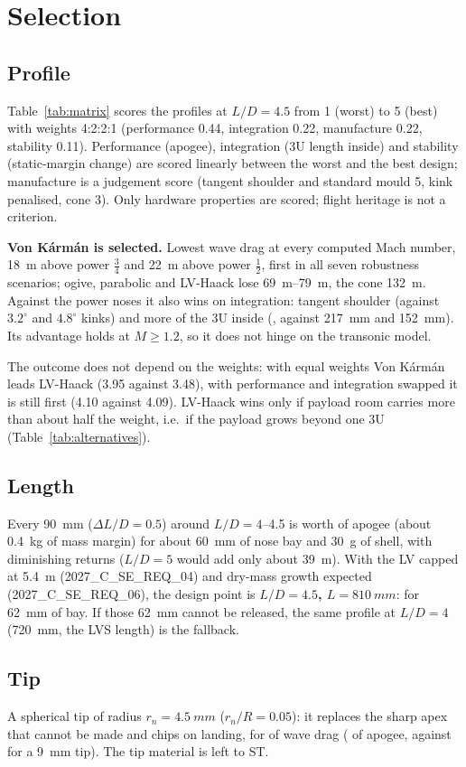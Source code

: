 \section{Selection}
\label{sec:selection}

\subsection{Profile}

Table~\ref{tab:matrix} scores the profiles at $L/D = 4.5$ from 1 (worst) to 5 (best) with weights 4:2:2:1
(performance 0.44, integration 0.22, manufacture 0.22, stability 0.11). Performance (apogee), integration
(3U length inside) and stability (static-margin change) are scored linearly between the worst and the best
design; manufacture is a judgement score (tangent shoulder and standard mould 5, kink penalised, cone 3).
Only hardware properties are scored; flight heritage is not a criterion.



\textbf{Von K\'arm\'an is selected.} Lowest wave drag at every computed Mach number, \SI{18}{m} above
power $\tfrac34$ and \SI{22}{m} above power $\tfrac12$, first in all seven robustness scenarios; ogive,
parabolic and LV-Haack lose \SIrange{69}{79}{m}, the cone \SI{132}{m}. Against the power noses it also wins
on integration: tangent shoulder (against $3.2^\circ$ and $4.8^\circ$ kinks) and more of the 3U inside
(\FINTHREEU{}, against \SI{217}{mm} and \SI{152}{mm}). Its advantage holds at $M \geq 1.2$, so it does not
hinge on the transonic model.

The outcome does not depend on the weights: with equal weights Von K\'arm\'an leads LV-Haack (3.95
against 3.48), with performance and integration swapped it is still first (4.10 against 4.09). LV-Haack
wins only if payload room carries more than about half the weight, i.e.\ if the payload grows beyond one
3U (Table~\ref{tab:alternatives}).

\subsection{Length}

Every \SI{90}{mm} ($\Delta L/D = 0.5$) around $L/D = 4$--4.5 is worth \TRADELEN{} of apogee (about
\SI{0.4}{kg} of mass margin) for about \SI{60}{mm} of nose bay and \SI{30}{g} of shell, with diminishing
returns ($L/D = 5$ would add only about \SI{39}{m}). With the LV capped at \SI{5.4}{m}
(2027\_C\_SE\_REQ\_04) and dry-mass growth expected (2027\_C\_SE\_REQ\_06), the design point is
\textbf{$L/D = 4.5$, $L = \SI{810}{mm}$}: \TRADELEN{} for \SI{62}{mm} of bay. If those \SI{62}{mm} cannot be
released, the same profile at $L/D = 4$ (\SI{720}{mm}, the LVS length) is the fallback.

\subsection{Tip}

A spherical tip of radius $r_n = \SI{4.5}{mm}$ ($r_n/R = 0.05$): it replaces the sharp apex that cannot be
made and chips on landing, for \BLUNTCOST{} of wave drag (\BLUNTAPOA{} of apogee, against \BLUNTAPOB{} for a
\SI{9}{mm} tip). The tip material is left to ST.
